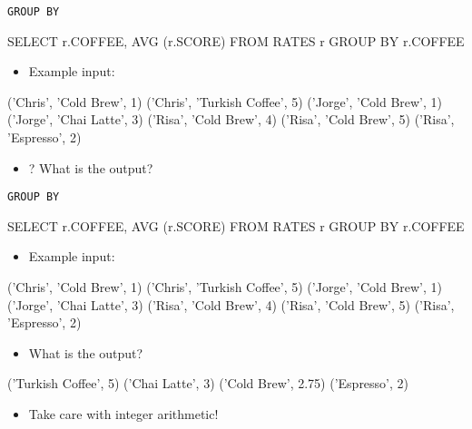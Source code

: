 \documentclass[aspectratio=169]{beamer}
\newenvironment{noindentitemize}
{ \begin{itemize}
 \setlength{\itemsep}{1.5ex}
  \setlength{\parsep}{0pt}   
  \setlength{\parskip}{0pt}
 \addtolength{\leftskip}{-2em}
 }
{ \end{itemize} }
\begin{document}
\begin{frame}[fragile]{\texttt{GROUP BY}}

\begin{SQL}
SELECT r.COFFEE, AVG (r.SCORE)
FROM RATES r
GROUP BY r.COFFEE
\end{SQL}

\begin{noindentitemize}
	\item Example input: 
\end{noindentitemize}	

\begin{SQL}
('Chris', 'Cold Brew', 1)
('Chris', 'Turkish Coffee', 5)
('Jorge', 'Cold Brew', 1)
('Jorge', 'Chai Latte', 3)
('Risa', 'Cold Brew', 4)
('Risa', 'Cold Brew', 5)
('Risa', 'Espresso', 2)
\end{SQL}

\begin{noindentitemize}
	\item[?]  What is the output? 
\end{noindentitemize}	

\end{frame}

\begin{frame}[fragile]{\texttt{GROUP BY}}

\begin{SQL}
SELECT r.COFFEE, AVG (r.SCORE)
FROM RATES r
GROUP BY r.COFFEE
\end{SQL}

\begin{noindentitemize}
	\item Example input: 
\end{noindentitemize}	

\begin{SQL}
('Chris', 'Cold Brew', 1)
('Chris', 'Turkish Coffee', 5)
('Jorge', 'Cold Brew', 1)
('Jorge', 'Chai Latte', 3)
('Risa', 'Cold Brew', 4)
('Risa', 'Cold Brew', 5)
('Risa', 'Espresso', 2)
\end{SQL}

\begin{noindentitemize}
	\item  What is the output? 
\end{noindentitemize}	

\begin{SQL}
('Turkish Coffee', 5)
('Chai Latte', 3)
('Cold Brew', 2.75)
('Espresso', 2)
\end{SQL}

\begin{noindentitemize}
	\item Take care with integer arithmetic! 
\end{noindentitemize}	
\end{frame}
\end{document}
